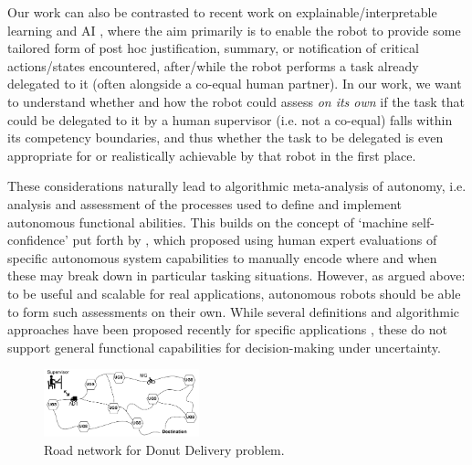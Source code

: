 Our work can also be contrasted to recent work on explainable/interpretable learning and AI \cite{Huang2018-ab,Lipton2016-ug,Ribeiro2016-uc,Guidotti2018-pi}, where the aim primarily is to enable the robot to provide some tailored form of post hoc justification, summary, or notification of critical actions/states encountered, after/while the robot performs a task already delegated to it (often alongside a co-equal human partner). In our work, we want to understand whether and how the robot could assess \emph{on its own} if the task that could be delegated to it by a human supervisor (i.e. not a co-equal) falls within its competency boundaries, and thus whether the task to be delegated is even appropriate for or realistically achievable by that robot in the first place. %

These considerations naturally lead to algorithmic meta-analysis of autonomy, i.e. analysis and assessment of the processes used to define and implement autonomous functional abilities. This builds on the concept of `machine self-confidence' put forth by \cite{Hutchins2015-if}, which proposed using human expert evaluations of specific autonomous system capabilities to manually encode where and when these may break down in particular tasking situations. However, as argued above: to be useful and scalable for real applications, autonomous robots should be able to form such assessments on their own. While several definitions and algorithmic approaches have been proposed recently for specific applications \cite{ Kuter2015-qh,Sweet2016-tz,  Zagorecki2015-qy}, these do not support general functional capabilities for decision-making under uncertainty. 
%


\begin{figure}[t]%
    	\centering
     	\includegraphics[width=0.4\textwidth]{Figures/RoadNet}
    	\caption{Road network for Donut Delivery problem.} 
        \label{fig:RoadNet}
        \vspace{-0.2cm}
\end{figure}    


